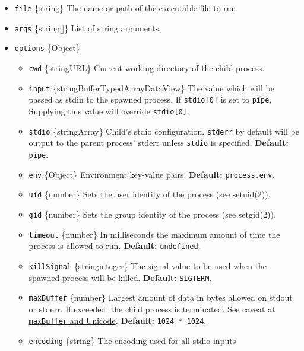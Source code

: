 \begin{itemize}
\tightlist
\item
  \texttt{file} \{string\} The name or path of the executable file to
  run.
\item
  \texttt{args} \{string{[}{]}\} List of string arguments.
\item
  \texttt{options} \{Object\}

  \begin{itemize}
  \tightlist
  \item
    \texttt{cwd} \{string\textbar URL\} Current working directory of the
    child process.
  \item
    \texttt{input}
    \{string\textbar Buffer\textbar TypedArray\textbar DataView\} The
    value which will be passed as stdin to the spawned process. If
    \texttt{stdio{[}0{]}} is set to
    \texttt{\textquotesingle{}pipe\textquotesingle{}}, Supplying this
    value will override \texttt{stdio{[}0{]}}.
  \item
    \texttt{stdio} \{string\textbar Array\} Child's stdio configuration.
    \texttt{stderr} by default will be output to the parent process'
    stderr unless \texttt{stdio} is specified. \textbf{Default:}
    \texttt{\textquotesingle{}pipe\textquotesingle{}}.
  \item
    \texttt{env} \{Object\} Environment key-value pairs.
    \textbf{Default:} \texttt{process.env}.
  \item
    \texttt{uid} \{number\} Sets the user identity of the process (see
    setuid(2)).
  \item
    \texttt{gid} \{number\} Sets the group identity of the process (see
    setgid(2)).
  \item
    \texttt{timeout} \{number\} In milliseconds the maximum amount of
    time the process is allowed to run. \textbf{Default:}
    \texttt{undefined}.
  \item
    \texttt{killSignal} \{string\textbar integer\} The signal value to
    be used when the spawned process will be killed. \textbf{Default:}
    \texttt{\textquotesingle{}SIGTERM\textquotesingle{}}.
  \item
    \texttt{maxBuffer} \{number\} Largest amount of data in bytes
    allowed on stdout or stderr. If exceeded, the child process is
    terminated. See caveat at
    \hyperref[maxbuffer-and-unicode]{\texttt{maxBuffer} and Unicode}.
    \textbf{Default:} \texttt{1024\ *\ 1024}.
  \item
    \texttt{encoding} \{string\} The encoding used for all stdio inputs

\end{itemize}
\end{itemize}
